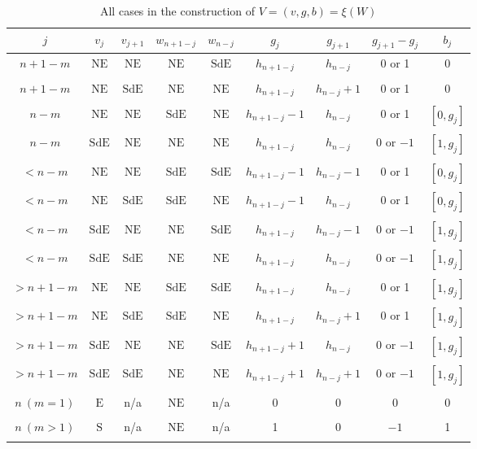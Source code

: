 \documentclass[12pt]{amsart}
\numberwithin{equation}{section}
\theoremstyle{plain}
\theoremstyle{definition}
\def\S{\mathrm{S}}
\def\E{\mathrm{E}}
\def\NE{\mathrm{NE}}
\def\SdE{\mathrm{SdE}}
\begin{document}
\begin{table}
{\small
\begin{tabular}{ccccccccc}
\toprule
$j$ & $v_j$ & $v_{j+1}$ & $w_{n+1-j}$ & $w_{n-j}$ & $g_j$ & $g_{j+1}$ & $g_{j+1}-g_j$ & $b_j$\\
\midrule
$n+1-m$ & $\NE$ & $\NE$ & $\NE$ & $\SdE$ & $h_{n+1-j}$ & $h_{n-j}$ & 0 or 1 & 0 \\
&&&&&&&& \\
$n+1-m$ & $\NE$ & $\SdE$ & $\NE$ & $\NE$ & $h_{n+1-j}$ & $h_{n-j}+1$ & 0 or 1 & 0 \\
&&&&&&&& \\
$n-m$ & $\NE$ & $\NE$ & $\SdE$ & $\NE$ & $h_{n+1-j}-1$ & $h_{n-j}$ & 0 or 1 & $[0,g_j]$ \\
&&&&&&&& \\
$n-m$ & $\SdE$ & $\NE$ & $\NE$ & $\NE$ & $h_{n+1-j}$ & $h_{n-j}$ & 0 or $-1$ & $[1,g_j]$ \\
&&&&&&&& \\
$<n-m$ & $\NE$ & $\NE$ & $\SdE$ & $\SdE$ & $h_{n+1-j}-1$ & $h_{n-j}-1$ & 0 or 1 & $[0,g_j]$ \\
&&&&&&&& \\
$<n-m$ & $\NE$ & $\SdE$ & $\SdE$ & $\NE$ & $h_{n+1-j}-1$ & $h_{n-j}$ & 0 or 1 & $[0,g_j]$ \\
&&&&&&&& \\
$<n-m$ & $\SdE$ & $\NE$ & $\NE$ & $\SdE$ & $h_{n+1-j}$ & $h_{n-j}-1$ & 0 or $-1$ & $[1,g_j]$ \\
&&&&&&&& \\
$<n-m$ & $\SdE$ & $\SdE$ & $\NE$ & $\NE$ & $h_{n+1-j}$ & $h_{n-j}$ & 0 or $-1$ & $[1,g_j]$ \\
&&&&&&&& \\
$>n+1-m$ & $\NE$ & $\NE$ & $\SdE$ & $\SdE$ & $h_{n+1-j}$ & $h_{n-j}$ & 0 or 1 & $[1,g_j]$ \\
&&&&&&&& \\
$>n+1-m$ & $\NE$ & $\SdE$ & $\SdE$ & $\NE$ & $h_{n+1-j}$ & $h_{n-j}+1$ & 0 or 1 & $[1,g_j]$ \\
&&&&&&&& \\
$>n+1-m$ & $\SdE$ & $\NE$ & $\NE$ & $\SdE$ & $h_{n+1-j}+1$ & $h_{n-j}$ & 0 or $-1$ & $[1,g_j]$ \\
&&&&&&&& \\
$>n+1-m$ & $\SdE$ & $\SdE$ & $\NE$ & $\NE$ & $h_{n+1-j}+1$ & $h_{n-j}+1$ & 0 or $-1$ & $[1,g_j]$ \\
&&&&&&&& \\
$n \: (m=1)$ & $\E$ & n/a & $\NE$ & n/a & 0 & 0 & 0 & 0 \\
&&&&&&&& \\
$n \: (m>1)$ & $\S$ & n/a & $\NE$ & n/a & 1 & 0 & $-1$ & 1 \\
\bottomrule\\
\end{tabular}
}
\caption{All cases in the construction of $V=(v,g,b)=\xi(W)$}\label{xsi-cases}
\end{table}
\end{document}
